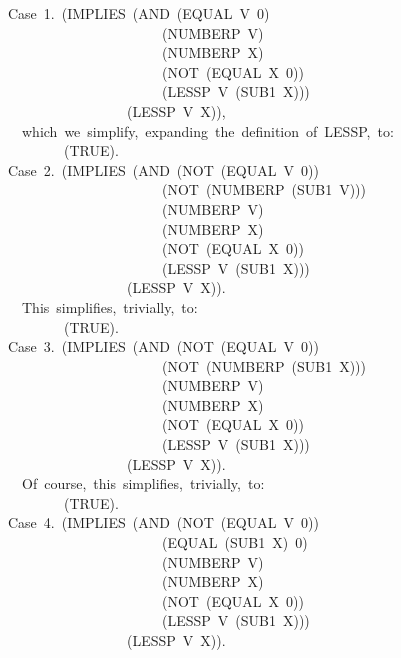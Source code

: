\documentclass[10pt]{book}
\newenvironment{pubasis}{\begin{flushleft}}{\end{flushleft}}
\begin{document}
\begin{pubasis}
~~Case~1.~(IMPLIES~(AND~(EQUAL~V~0)\\
~~~~~~~~~~~~~~~~~~~~~~~~(NUMBERP~V)\\
~~~~~~~~~~~~~~~~~~~~~~~~(NUMBERP~X)\\
~~~~~~~~~~~~~~~~~~~~~~~~(NOT~(EQUAL~X~0))\\
~~~~~~~~~~~~~~~~~~~~~~~~(LESSP~V~(SUB1~X)))\\
~~~~~~~~~~~~~~~~~~~(LESSP~V~X)),\\

~~~~which~we~simplify,~expanding~the~definition~of~LESSP,~to:\\

~~~~~~~~~~(TRUE).\\

~~Case~2.~(IMPLIES~(AND~(NOT~(EQUAL~V~0))\\
~~~~~~~~~~~~~~~~~~~~~~~~(NOT~(NUMBERP~(SUB1~V)))\\
~~~~~~~~~~~~~~~~~~~~~~~~(NUMBERP~V)\\
~~~~~~~~~~~~~~~~~~~~~~~~(NUMBERP~X)\\
~~~~~~~~~~~~~~~~~~~~~~~~(NOT~(EQUAL~X~0))\\
~~~~~~~~~~~~~~~~~~~~~~~~(LESSP~V~(SUB1~X)))\\
~~~~~~~~~~~~~~~~~~~(LESSP~V~X)).\\

~~~~This~simplifies,~trivially,~to:\\

~~~~~~~~~~(TRUE).\\

~~Case~3.~(IMPLIES~(AND~(NOT~(EQUAL~V~0))\\
~~~~~~~~~~~~~~~~~~~~~~~~(NOT~(NUMBERP~(SUB1~X)))\\
~~~~~~~~~~~~~~~~~~~~~~~~(NUMBERP~V)\\
~~~~~~~~~~~~~~~~~~~~~~~~(NUMBERP~X)\\
~~~~~~~~~~~~~~~~~~~~~~~~(NOT~(EQUAL~X~0))\\
~~~~~~~~~~~~~~~~~~~~~~~~(LESSP~V~(SUB1~X)))\\
~~~~~~~~~~~~~~~~~~~(LESSP~V~X)).\\

~~~~Of~course,~this~simplifies,~trivially,~to:\\

~~~~~~~~~~(TRUE).\\

~~Case~4.~(IMPLIES~(AND~(NOT~(EQUAL~V~0))\\
~~~~~~~~~~~~~~~~~~~~~~~~(EQUAL~(SUB1~X)~0)\\
~~~~~~~~~~~~~~~~~~~~~~~~(NUMBERP~V)\\
~~~~~~~~~~~~~~~~~~~~~~~~(NUMBERP~X)\\
~~~~~~~~~~~~~~~~~~~~~~~~(NOT~(EQUAL~X~0))\\
~~~~~~~~~~~~~~~~~~~~~~~~(LESSP~V~(SUB1~X)))\\
~~~~~~~~~~~~~~~~~~~(LESSP~V~X)).\\


\end{pubasis}
\end{document}
